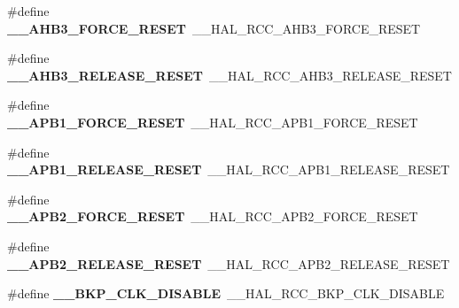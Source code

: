 \begin{DoxyCompactItemize}
\item 
\mbox{\label{group___h_a_l___r_c_c___aliased_ga967e453f7a2dc917a2f43041bc3530bc}} 
\#define {\bfseries \+\_\+\+\_\+\+A\+H\+B3\+\_\+\+F\+O\+R\+C\+E\+\_\+\+R\+E\+S\+ET}~\+\_\+\+\_\+\+H\+A\+L\+\_\+\+R\+C\+C\+\_\+\+A\+H\+B3\+\_\+\+F\+O\+R\+C\+E\+\_\+\+R\+E\+S\+ET
\item 
\mbox{\label{group___h_a_l___r_c_c___aliased_gacf2ccc00726b7722836cddb8f42db97c}} 
\#define {\bfseries \+\_\+\+\_\+\+A\+H\+B3\+\_\+\+R\+E\+L\+E\+A\+S\+E\+\_\+\+R\+E\+S\+ET}~\+\_\+\+\_\+\+H\+A\+L\+\_\+\+R\+C\+C\+\_\+\+A\+H\+B3\+\_\+\+R\+E\+L\+E\+A\+S\+E\+\_\+\+R\+E\+S\+ET
\item 
\mbox{\label{group___h_a_l___r_c_c___aliased_gad52dd8358580ee80c5d66fb0ae3208fa}} 
\#define {\bfseries \+\_\+\+\_\+\+A\+P\+B1\+\_\+\+F\+O\+R\+C\+E\+\_\+\+R\+E\+S\+ET}~\+\_\+\+\_\+\+H\+A\+L\+\_\+\+R\+C\+C\+\_\+\+A\+P\+B1\+\_\+\+F\+O\+R\+C\+E\+\_\+\+R\+E\+S\+ET
\item 
\mbox{\label{group___h_a_l___r_c_c___aliased_ga497e83304224dd4740b388fe296beaf0}} 
\#define {\bfseries \+\_\+\+\_\+\+A\+P\+B1\+\_\+\+R\+E\+L\+E\+A\+S\+E\+\_\+\+R\+E\+S\+ET}~\+\_\+\+\_\+\+H\+A\+L\+\_\+\+R\+C\+C\+\_\+\+A\+P\+B1\+\_\+\+R\+E\+L\+E\+A\+S\+E\+\_\+\+R\+E\+S\+ET
\item 
\mbox{\label{group___h_a_l___r_c_c___aliased_ga92a0e6fcc37827864d686e5d023d8472}} 
\#define {\bfseries \+\_\+\+\_\+\+A\+P\+B2\+\_\+\+F\+O\+R\+C\+E\+\_\+\+R\+E\+S\+ET}~\+\_\+\+\_\+\+H\+A\+L\+\_\+\+R\+C\+C\+\_\+\+A\+P\+B2\+\_\+\+F\+O\+R\+C\+E\+\_\+\+R\+E\+S\+ET
\item 
\mbox{\label{group___h_a_l___r_c_c___aliased_ga68340225a9f3449d73f454972cf01726}} 
\#define {\bfseries \+\_\+\+\_\+\+A\+P\+B2\+\_\+\+R\+E\+L\+E\+A\+S\+E\+\_\+\+R\+E\+S\+ET}~\+\_\+\+\_\+\+H\+A\+L\+\_\+\+R\+C\+C\+\_\+\+A\+P\+B2\+\_\+\+R\+E\+L\+E\+A\+S\+E\+\_\+\+R\+E\+S\+ET
\item 
\mbox{\label{group___h_a_l___r_c_c___aliased_ga266ad5c1a161c961123d8f3d6db2fc69}} 
\#define {\bfseries \+\_\+\+\_\+\+B\+K\+P\+\_\+\+C\+L\+K\+\_\+\+D\+I\+S\+A\+B\+LE}~\+\_\+\+\_\+\+H\+A\+L\+\_\+\+R\+C\+C\+\_\+\+B\+K\+P\+\_\+\+C\+L\+K\+\_\+\+D\+I\+S\+A\+B\+LE

\end{DoxyCompactItemize}
